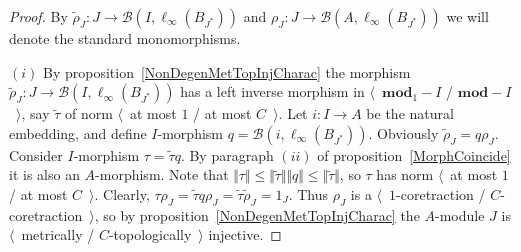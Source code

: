 \begin{proof} By $\widetilde{\rho}_J:J\to\mathcal{B}(I,\ell_\infty(B_{J^*}))$
and $\rho_J:J\to\mathcal{B}(A,\ell_\infty(B_{J^*}))$ we will denote the standard
monomorphisms.

$(i)$ By proposition~\ref{NonDegenMetTopInjCharac} the morphism
$\widetilde{\rho}_J: J\to\mathcal{B}(I,\ell_\infty(B_{J^*}))$ has a left inverse
morphism in $\langle$~$\mathbf{mod}_1-I$ / $\mathbf{mod}-I$~$\rangle$, say
$\widetilde{\tau}$ of norm $\langle$~at most $1$ / at most $C$~$\rangle$. Let
$i:I\to A$ be the natural embedding, and define $I$-morphism
$q=\mathcal{B}(i,\ell_\infty(B_{J^*}))$. Obviously
$\widetilde{\rho}_J=q\rho_J$. Consider $I$-morphism $\tau =\widetilde{\tau} q$.
By paragraph $(ii)$ of proposition~\ref{MorphCoincide} it is also an
$A$-morphism. Note that 
$\Vert\tau \Vert
\leq\Vert\widetilde{\tau}\Vert\Vert q\Vert
\leq\Vert\widetilde{\tau}\Vert$, 
so $\tau$ has norm $\langle$~at most $1$ / at most $C$~$\rangle$. 
Clearly, 
$\tau \rho_J=\widetilde{\tau} q\rho_J=\widetilde{\tau}\widetilde{\rho}_J=1_J$. 
Thus $\rho_J$ is a $\langle$~$1$-coretraction / $C$-coretraction~$\rangle$, 
so by proposition~\ref{NonDegenMetTopInjCharac} the $A$-module $J$ is
$\langle$~metrically / $C$-topologically~$\rangle$ injective.


\end{proof}
